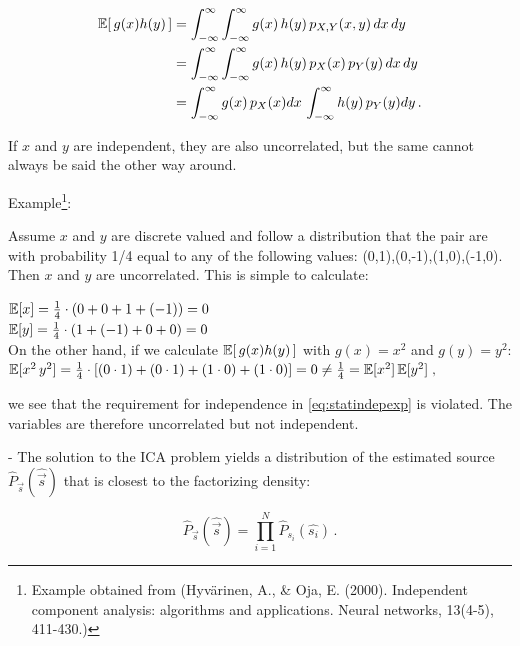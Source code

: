 \begin{align}
\mathbb{E}  \lbrack \, g(x) h(y) \, \rbrack &= \int_{-\infty}^{\infty} \int_{-\infty}^{\infty} g(x) \, h(y) \, p_{X,Y}(x,y) \, dx \, dy \\
&= \int_{-\infty}^{\infty} \int_{-\infty}^{\infty} g(x) \, h(y)  \, p_X(x) \, p_Y(y) \, dx \, dy \\
&= \int_{-\infty}^{\infty}  g(x) \, p_X(x) dx\, \int_{-\infty}^{\infty} h(y) \, p_Y(y) dy
\,.
\end{align}

If $x$ and $y$ are independent, they are also uncorrelated, but the same cannot always be said the other way around.

Example\footnote{Example obtained from (Hyv\"arinen, A., \& Oja, E. (2000). Independent component analysis: algorithms and applications. Neural networks, 13(4-5), 411-430.)}:

Assume $x$ and $y$ are discrete valued and follow a distribution that the pair are with probability 1/4 equal to any of the following
values: (0,1),(0,-1),(1,0),(-1,0). Then $x$ and $y$ are uncorrelated. This is simple to calculate:

$\mathbb{E} \lbrack x \rbrack = \frac{1}{4} \cdot (0 + 0 + 1 + (-1)) = 0$\\[2mm]
$\mathbb{E} \lbrack y \rbrack = \frac{1}{4} \cdot (1 + (-1) + 0 + 0) = 0$\\

On the other hand, if we calculate $\mathbb{E}  \lbrack \, g(x) h(y) \, \rbrack$ with $g(x)=x^2$ and $g(y)=y^2$:\\

$\mathbb{E} \lbrack x^2 \, y^2 \rbrack 
= \frac{1}{4} \cdot \lbrack (0\cdot1) + (0\cdot1) + (1\cdot0) + (1\cdot0) \rbrack = 0 
\ne \frac{1}{4} = \mathbb{E} \lbrack x^2 \rbrack \, \mathbb{E} \lbrack y^2 \rbrack \;,$

we see that the requirement for independence in \eqref{eq:statindepexp} is violated. The variables are therefore uncorrelated but not independent.

\newpage


- The solution to the ICA problem yields a distribution of the estimated source $\widehat{P}_{\vec s}(\widehat{\vec s})$ that is closest to the factorizing density:

\begin{equation}
\label{eq:facts}
\widehat{P}_{\vec s}(\widehat{\vec s}) = \prod_{i=1}^{N} \widehat{P}_{s_i}(\widehat{s_i})  \,.
\end{equation}


